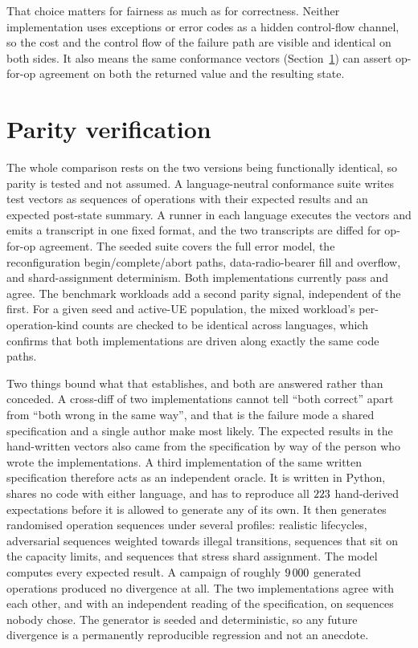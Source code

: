 \documentclass[english,oneside,a4paper,censored,csm,software-track-2020]{HYthesisML}
\begin{document}
That choice matters for fairness as much as for correctness. Neither implementation uses
exceptions or error codes as a hidden control-flow channel, so the cost and the control flow of
the failure path are visible and identical on both sides. It also means the same conformance
vectors (Section~\ref{sec:parity}) can assert op-for-op agreement on both the returned value and
the resulting state.

\section{Parity verification}
\label{sec:parity}
The whole comparison rests on the two versions being functionally identical, so parity
is tested and not assumed. A language-neutral conformance suite writes test vectors as
sequences of operations with their expected results and an expected post-state summary. A
runner in each language executes the vectors and emits a transcript in one fixed format, and the
two transcripts are diffed for op-for-op agreement. The seeded suite covers the full error model,
the reconfiguration begin/complete/abort paths, data-radio-bearer fill and overflow, and
shard-assignment determinism. Both implementations currently pass and agree. The benchmark
workloads add a second parity signal, independent of the first. For a given seed and active-UE
population, the mixed workload's per-operation-kind counts are checked to be identical across
languages, which confirms that both implementations are driven along exactly the same code paths.

Two things bound what that establishes, and both are answered rather than conceded. A
cross-diff of two implementations cannot tell ``both correct'' apart from ``both wrong in the
same way'', and that is the failure mode a shared specification and a single author make most
likely. The expected results in the hand-written vectors also came from the
specification by way of the person who wrote the implementations. A third implementation of the
same written specification therefore acts as an independent oracle. It is written in Python,
shares no code with either language, and has to reproduce all $223$ hand-derived
expectations before it is allowed to generate any of its own. It then generates randomised
operation sequences under several profiles: realistic lifecycles, adversarial sequences
weighted towards illegal transitions, sequences that sit on the capacity limits, and sequences
that stress shard assignment. The model computes every expected result. A campaign
of roughly $9\,000$ generated operations produced no divergence at all. The two
implementations agree with each other, and with an independent reading of the specification, on
sequences nobody chose. The generator is seeded and deterministic, so any future divergence is a
permanently reproducible regression and not an anecdote.
\end{document}
